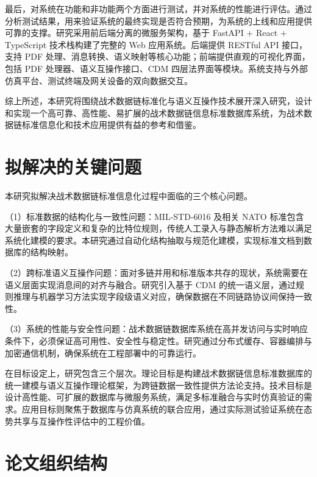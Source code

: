 最后，对系统在功能和非功能两个方面进行测试，并对系统的性能进行评估。通过分析测试结果，用来验证系统的最终实现是否符合预期，为系统的上线和应用提供可靠的支撑。研究采用前后端分离的微服务架构，基于 FastAPI + React + TypeScript 技术栈构建了完整的 Web 应用系统\cite{Waseem2021Design,MonitoringTools2024}。后端提供 RESTful API 接口，支持 PDF 处理、消息转换、语义映射等核心功能；前端提供直观的可视化界面，包括 PDF 处理器、语义互操作接口、CDM 四层法界面等模块。系统支持与外部仿真平台、测试终端及网关设备的双向数据交互\cite{SAIC_JRE_Overview_2021,Collins_TTR_2021,L3Harris_STT_KOR24A_2020}。

综上所述，本研究将围绕战术数据链标准化与语义互操作技术展开深入研究，设计和实现一个高可靠、高性能、易扩展的战术数据链信息标准数据库系统，为战术数据链标准信息化和技术应用提供有益的参考和借鉴。

\section{拟解决的关键问题}

本研究拟解决战术数据链标准信息化过程中面临的三个核心问题。

（1）标准数据的结构化与一致性问题：MIL-STD-6016 及相关 NATO 标准包含大量嵌套的字段定义和复杂的比特位规则，传统人工录入与静态解析方法难以满足系统化建模的要求\cite{MIL_STD_6016_Active_2024,SISO_STD_002_2006}。本研究通过自动化结构抽取与规范化建模，实现标准文档到数据库的结构映射。

（2）跨标准语义互操作问题：面对多链并用和标准版本共存的现状，系统需要在语义层面实现消息间的对齐与融合\cite{Hamdan2023Reference,MITRE_Link16_Interoperability_2024}。研究引入基于 CDM 的统一语义层，通过规则推理与机器学习方法实现字段级语义对应，确保数据在不同链路协议间保持一致性。

（3）系统的性能与安全性问题：战术数据链数据库系统在高并发访问与实时响应条件下，必须保证高可用性、安全性与稳定性\cite{Waseem2021Design,MonitoringTools2024}。研究通过分布式缓存、容器编排与加密通信机制，确保系统在工程部署中的可靠运行。

在目标设定上，研究包含三个层次。理论目标是构建战术数据链信息标准数据库的统一建模与语义互操作理论框架，为跨链数据一致性提供方法论支持。技术目标是设计高性能、可扩展的数据库与微服务系统，满足多标准融合与实时仿真验证的需求。应用目标则聚焦于数据库与仿真系统的联合应用，通过实际测试验证系统在态势共享与互操作性评估中的工程价值\cite{SAIC_JRE_Overview_2021,CurtissWright_TCG_HUNTR_2020,DOTE_2022_MIDS_LVT}。

\section{论文组织结构}


